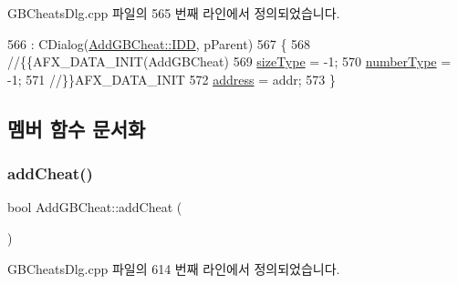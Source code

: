 G\+B\+Cheats\+Dlg.\+cpp 파일의 565 번째 라인에서 정의되었습니다.


\begin{DoxyCode}
566   : CDialog(\mbox{\hyperlink{class_add_g_b_cheat_ae307c54936e2ef002f6323ab0d1fa05eaa142321cb7a25da95b16f0c2ea74993f}{AddGBCheat::IDD}}, pParent)
567 \{
568   \textcolor{comment}{//\{\{AFX\_DATA\_INIT(AddGBCheat)}
569   \mbox{\hyperlink{class_add_g_b_cheat_ae0603ce2570d5b09a64f4bd6c2107962}{sizeType}} = -1;
570   \mbox{\hyperlink{class_add_g_b_cheat_ab49fa34156026418e26edf606aa82b1a}{numberType}} = -1;
571   \textcolor{comment}{//\}\}AFX\_DATA\_INIT}
572   \mbox{\hyperlink{class_add_g_b_cheat_adb910488c84e165b4fd33646b932ee2e}{address}} = addr;
573 \}
\end{DoxyCode}


\subsection{멤버 함수 문서화}
\mbox{\label{class_add_g_b_cheat_a054ba5040a40f7ef4b3a0ddb5a458592}} 
\subsubsection{\texorpdfstring{add\+Cheat()}{addCheat()}}
{\footnotesize\ttfamily bool Add\+G\+B\+Cheat\+::add\+Cheat (\begin{DoxyParamCaption}{ }\end{DoxyParamCaption})}



G\+B\+Cheats\+Dlg.\+cpp 파일의 614 번째 라인에서 정의되었습니다.


